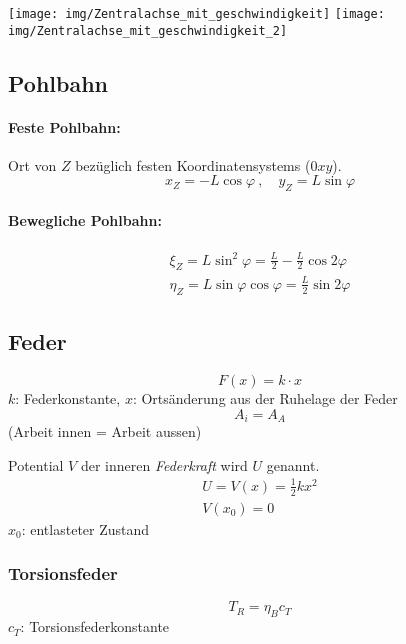 \documentclass{article}
\begin{document}
\begin{multicols*}{4}
\begin{itemize}
						\end{itemize}
						\begin{center}
							\texttt{[image: img/Zentralachse\_mit\_geschwindigkeit]}
							\texttt{[image: img/Zentralachse\_mit\_geschwindigkeit\_2]}
						\end{center}
			\subsection{Pohlbahn} %
				\paragraph{Feste Pohlbahn:} %
					Ort von $Z$ bezüglich festen Koordinatensystems ($0xy$).
					\[
						x_Z = -L \cos \varphi \ , \quad y_Z = L \sin \varphi
					\]
				\paragraph{Bewegliche Pohlbahn:} %
					\begin{gather*}
						\xi_Z = L \sin^2 \varphi = \frac{L}{2} - \frac{L}{2} \cos{2\varphi} \\
						\eta_Z = L \sin{\varphi} \cos{\varphi} = \frac{L}{2} \sin{2\varphi}
					\end{gather*}
			\subsection{Feder} %
				\[
					F(x) = k \cdot x
				\]
				$k$: Federkonstante, $x$: Ortsänderung aus der Ruhelage der Feder
				\[
					A_i = A_A
				\]
				(Arbeit innen = Arbeit aussen)
				
				Potential $V$ der inneren \emph{Federkraft} wird $U$ genannt.
				\begin{gather*}
					U = V(x) = \frac{1}{2} k x^2 \\
					V(x_0) = 0
				\end{gather*}
				$x_0$: entlasteter Zustand
				
				\subsubsection{Torsionsfeder} %
					\[
						T_R = \eta_B c_T
					\]
					$c_T$: Torsionsfederkonstante
	\end{multicols*}
\end{document}
